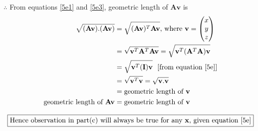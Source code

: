 \documentclass[12pt, letterpaper]{article}
\begin{document}
$\therefore$ From equations \ref{5e1} and \ref{5e3}, geometric length of $\mathbf{Av}$ is
\[\begin{split}
\sqrt{(\mathbf{Av}).(\mathbf{Av})} &= \sqrt{(\mathbf{Av})^T\mathbf{Av}}
\text{, where }\mathbf{v} = \begin{pmatrix}x\\y\\z\end{pmatrix}\\
  &= \sqrt{\mathbf{v}^T\mathbf{A}^T\mathbf{Av}}
  = \sqrt{\mathbf{v}^T(\mathbf{A}^T\mathbf{A})\mathbf{v}}\\
  &= \sqrt{\mathbf{v}^T(\mathbf{I})\mathbf{v}}\,\,\,\,[\text{from equation \ref{5e}}]\\
  &= \sqrt{\mathbf{v}^T\mathbf{v}} = \sqrt{\mathbf{v}.\mathbf{v}}\\
  &= \text{geometric length of }\mathbf{v}\\
  \text{geometric length of }\mathbf{Av} &= \text{geometric length of }\mathbf{v}
\end{split}\]

\[\boxed{\text{Hence observation in part(c) will always be true for any $\mathbf{x}$, given equation \ref{5e}}}\]
\end{document}
